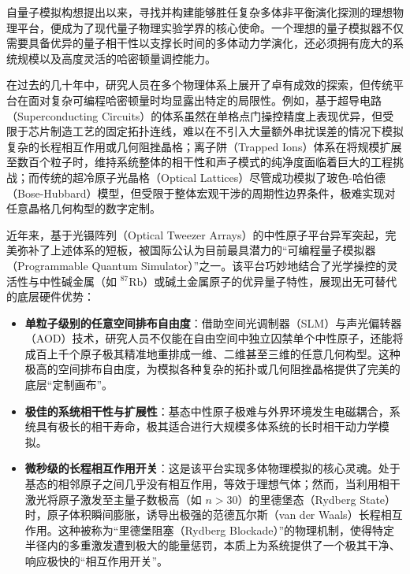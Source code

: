 \documentclass[../main.tex]{subfiles}
\begin{document}
自量子模拟构想提出以来，寻找并构建能够胜任复杂多体非平衡演化探测的理想物理平台，便成为了现代量子物理实验学界的核心使命。一个理想的量子模拟器不仅需要具备优异的量子相干性以支撑长时间的多体动力学演化，还必须拥有庞大的系统规模以及高度灵活的哈密顿量调控能力。

在过去的几十年中，研究人员在多个物理体系上展开了卓有成效的探索，但传统平台在面对复杂可编程哈密顿量时均显露出特定的局限性。例如，基于超导电路（Superconducting Circuits）的体系虽然在单格点门操控精度上表现优异，但受限于芯片制造工艺的固定拓扑连线，难以在不引入大量额外串扰误差的情况下模拟复杂的长程相互作用或几何阻挫晶格；离子阱（Trapped Ions）体系在将规模扩展至数百个粒子时，维持系统整体的相干性和声子模式的纯净度面临着巨大的工程挑战；而传统的超冷原子光晶格（Optical Lattices）尽管成功模拟了玻色-哈伯德（Bose-Hubbard）模型，但受限于整体宏观干涉的周期性边界条件，极难实现对任意晶格几何构型的数字定制。

近年来，基于光镊阵列（Optical Tweezer Arrays）的中性原子平台异军突起，完美弥补了上述体系的短板，被国际公认为目前最具潜力的“可编程量子模拟器（Programmable Quantum Simulator）”之一。该平台巧妙地结合了光学操控的灵活性与中性碱金属（如 $^{87}\text{Rb}$）或碱土金属原子的优异量子特性，展现出无可替代的底层硬件优势：

\begin{itemize}
    \item \textbf{单粒子级别的任意空间排布自由度}：借助空间光调制器（SLM）与声光偏转器（AOD）技术，研究人员不仅能在自由空间中独立囚禁单个中性原子，还能将成百上千个原子极其精准地重排成一维、二维甚至三维的任意几何构型。这种极高的空间排布自由度，为模拟各种复杂的拓扑或几何阻挫晶格提供了完美的底层“定制画布”。
    \item \textbf{极佳的系统相干性与扩展性}：基态中性原子极难与外界环境发生电磁耦合，系统具有极长的相干寿命，极其适合进行大规模多体系统的长时相干动力学模拟。
    \item \textbf{微秒级的长程相互作用开关}：这是该平台实现多体物理模拟的核心灵魂。处于基态的相邻原子之间几乎没有相互作用，等效于理想气体；然而，当利用相干激光将原子激发至主量子数极高（如 $n > 30$）的里德堡态（Rydberg State）时，原子体积瞬间膨胀，诱导出极强的范德瓦尔斯（van der Waals）长程相互作用。这种被称为“里德堡阻塞（Rydberg Blockade）”的物理机制，使得特定半径内的多重激发遭到极大的能量惩罚，本质上为系统提供了一个极其干净、响应极快的“相互作用开关”。
\end{itemize}
\end{document}
